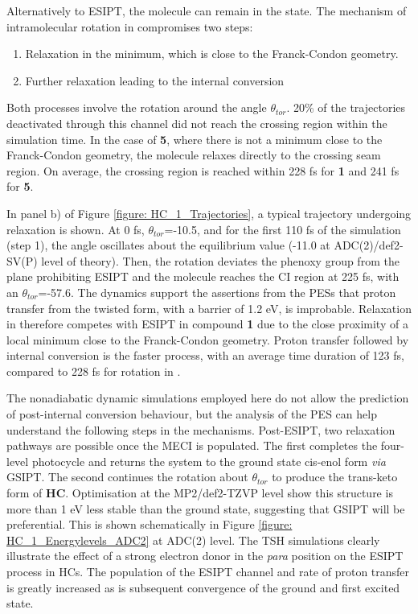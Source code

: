 Alternatively to ESIPT, the molecule can remain in the \Estar{} state. The mechanism of intramolecular rotation in \Estar{} compromises two steps: 
\begin{enumerate}
    \item Relaxation in the \Estar{} minimum, which is close to the Franck-Condon geometry.
    \item Further relaxation leading to the internal conversion
\end{enumerate}
Both processes involve the rotation around the angle $\theta_{tor}$. 20\% of the trajectories deactivated through this channel did not reach the crossing region within the simulation time. In the case of \textbf{5}, where there is not a \Estar{} minimum close to the Franck-Condon geometry, the molecule relaxes directly to the crossing seam region. On average, the crossing region is reached within  228 fs for \textbf{1} and 241 fs for \textbf{5}. 

In panel b) of Figure \ref{figure: HC_1_Trajectories}, a typical trajectory undergoing \Estar{} relaxation is shown. At 0 fs,  $\theta_{tor}$=-10.5\textdegree{}, and for the first 110 fs of the simulation (step 1), the angle oscillates about the equilibrium value (-11.0\textdegree{} at ADC(2)/def2-SV(P) level of theory). Then, the rotation deviates the phenoxy group from the plane prohibiting ESIPT and the molecule reaches the CI region at 225 fs, with an $\theta_{tor}$=-57.6\textdegree{}. The dynamics support the assertions from the \acp{PES} that proton transfer from the twisted \Estar{} form, with a barrier of 1.2 eV, is improbable. Relaxation in \Estar{} therefore competes with ESIPT in compound \textbf{1} due to the close proximity of a local minimum close to the Franck-Condon geometry. Proton transfer followed by internal conversion is the faster process, with an average time duration of 123 fs, compared to 228 fs for rotation in \Estar{}.

The nonadiabatic dynamic simulations employed here do not allow the prediction of post-internal conversion behaviour, but the analysis of the PES can help understand the following steps in the mechanisms. Post-ESIPT, two relaxation pathways are possible once the MECI is populated. The first completes the four-level photocycle and returns the system to the ground state cis-enol form \textit{via} \ac{GSIPT}. The second continues the rotation about $\theta_{tor}$ to produce the trans-keto form of \textbf{HC}.  Optimisation at the MP2/def2-TZVP level show this structure is more than 1 eV less stable than the ground state, suggesting that \ac{GSIPT} will be preferential. This is shown schematically in Figure \ref{figure: HC_1_Energylevels_ADC2} at ADC(2) level. The \ac{TSH} simulations clearly illustrate the effect of a strong electron donor in the \textit{para} position on the ESIPT process in \ac{HC}s. The population of the ESIPT channel and rate of proton transfer is greatly increased as is subsequent convergence of the ground and first excited state. 

